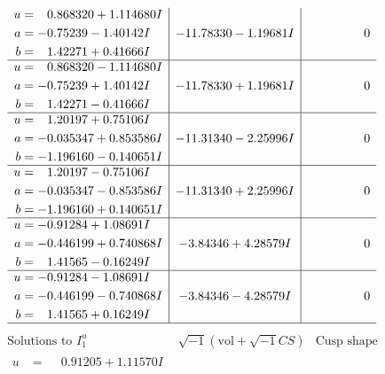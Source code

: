 \documentclass[1p]{elsarticle_modified}
\theoremstyle{definition}
\newcommand{\I}{\sqrt{-1}}
\begin{document}
$$\begin{array}{c|c|c}
\begin{aligned}
u &= \phantom{-}0.868320 + 1.114680 I \\
a &= -0.75239 - 1.40142 I \\
b &= \phantom{-}1.42271 + 0.41666 I\end{aligned}
 & -11.78330 - 1.19681 I & \phantom{-0.000000 } 0 \\ \hline\begin{aligned}
u &= \phantom{-}0.868320 - 1.114680 I \\
a &= -0.75239 + 1.40142 I \\
b &= \phantom{-}1.42271 - 0.41666 I\end{aligned}
 & -11.78330 + 1.19681 I & \phantom{-0.000000 } 0 \\ \hline\begin{aligned}
u &= \phantom{-}1.20197 + 0.75106 I \\
a &= -0.035347 + 0.853586 I \\
b &= -1.196160 - 0.140651 I\end{aligned}
 & -11.31340 - 2.25996 I & \phantom{-0.000000 } 0 \\ \hline\begin{aligned}
u &= \phantom{-}1.20197 - 0.75106 I \\
a &= -0.035347 - 0.853586 I \\
b &= -1.196160 + 0.140651 I\end{aligned}
 & -11.31340 + 2.25996 I & \phantom{-0.000000 } 0 \\ \hline\begin{aligned}
u &= -0.91284 + 1.08691 I \\
a &= -0.446199 + 0.740868 I \\
b &= \phantom{-}1.41565 - 0.16249 I\end{aligned}
 & -3.84346 + 4.28579 I & \phantom{-0.000000 } 0 \\ \hline\begin{aligned}
u &= -0.91284 - 1.08691 I \\
a &= -0.446199 - 0.740868 I \\
b &= \phantom{-}1.41565 + 0.16249 I\end{aligned}
 & -3.84346 - 4.28579 I & \phantom{-0.000000 } 0\\
 \hline 
 \end{array}$$\newpage$$\begin{array}{c|c|c}  
\text{Solutions to }I^u_{1}& \I (\text{vol} + \sqrt{-1}CS) & \text{Cusp shape}\\
 \hline 
\begin{aligned}
u &= \phantom{-}0.91205 + 1.11570 I \\

\end{aligned}
\end{array}$$
\end{document}
